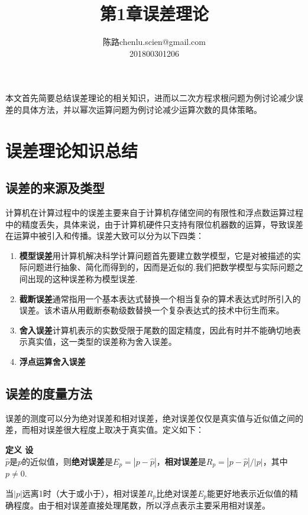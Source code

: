 \documentclass[UTF8]{ctexart}
\makeatletter
\newenvironment{dingyi}[2][定义]
	{\begin{mdframed}[backgroundcolor=gray!20] \textbf{#1 #2} \\}
		{\end{mdframed}}
\newcommand\assignmentNumber{1}
\newcommand\studentName{陈路}
\newcommand\studentEmail{chenlu.scien@gmail.com}
\newcommand\studentNumber{201800301206}
\makeatother
\begin{document}
    
    \title{第\assignmentNumber 章\quad 误差理论}
    
    \author{\name \studentName \email \studentEmail \\
    \studentNumber
    }
    
    \maketitle

本文首先简要总结误差理论的相关知识，进而以二次方程求根问题为例讨论减少误差的具体方法，并以幂次运算问题为例讨论减少运算次数的具体策略。

\section{误差理论知识总结}\label{sec:background}
\subsection{误差的来源及类型}
计算机在计算过程中的误差主要来自于计算机存储空间的有限性和浮点数运算过程中的精度丢失，具体来说，由于计算机硬件只支持有限位机器数的运算，导致误差在运算中被引入和传播。误差大致可以分为以下四类：
\begin{enumerate}
	\item \textbf{模型误差}\quad 用计算机解决科学计算问题首先要建立数学模型，它是对被描述的实际问题进行抽象、简化而得到的，因而是近似的.我们把数学模型与实际问题之间出现的这种误差称为模型误差.
	\item \textbf{截断误差}\quad 通常指用一个基本表达式替换一个相当复杂的算术表达式时所引入的误差。该术语从用截断泰勒级数替换一个复杂表达式的技术中衍生而来。
	\item \textbf{舍入误差}\quad 计算机表示的实数受限于尾数的固定精度，因此有时并不能确切地表示真实值，这一类型的误差称为舍入误差。
	\item \textbf{浮点运算舍入误差}
\end{enumerate}

\subsection{误差的度量方法}
误差的测度可以分为绝对误差和相对误差，绝对误差仅仅是真实值与近似值之间的差，而相对误差很大程度上取决于真实值。定义如下：
\begin{dingyi}{1}
	设$\hat{p}$是$p$的近似值，则\textbf{绝对误差}是$E_{p}=|p-\hat{p}|$，\textbf{相对误差}是$R_{p}=|p-\hat{p}|/|p|$，其中$p\neq0$.
\end{dingyi}
当$|p|$远离1时（大于或小于），相对误差$R_{p}$比绝对误差$E_{p}$能更好地表示近似值的精确程度。由于相对误差直接处理尾数，所以浮点表示主要采用相对误差。
\end{document}
